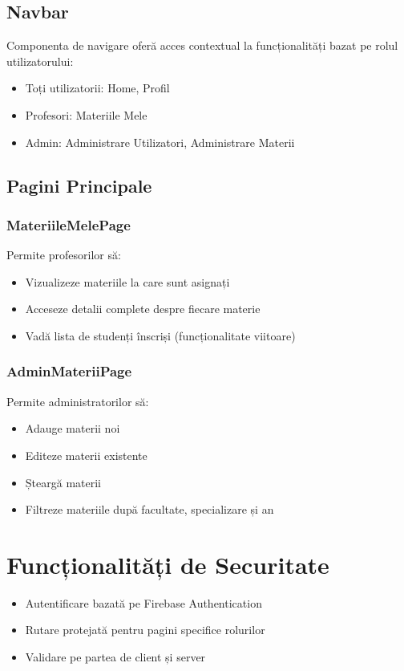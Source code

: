 \documentclass[12pt,a4paper]{article}
\begin{document}
\subsection{Navbar}
Componenta de navigare oferă acces contextual la funcționalități bazat pe rolul utilizatorului:
\begin{itemize}
    \item Toți utilizatorii: Home, Profil
    \item Profesori: Materiile Mele
    \item Admin: Administrare Utilizatori, Administrare Materii
\end{itemize}

\subsection{Pagini Principale}
\subsubsection{MateriileMelePage}
Permite profesorilor să:
\begin{itemize}
    \item Vizualizeze materiile la care sunt asignați
    \item Acceseze detalii complete despre fiecare materie
    \item Vadă lista de studenți înscriși (funcționalitate viitoare)
\end{itemize}

\subsubsection{AdminMateriiPage}
Permite administratorilor să:
\begin{itemize}
    \item Adauge materii noi
    \item Editeze materii existente
    \item Șteargă materii
    \item Filtreze materiile după facultate, specializare și an
\end{itemize}

\section{Funcționalități de Securitate}
\begin{itemize}
    \item Autentificare bazată pe Firebase Authentication
    \item Rutare protejată pentru pagini specifice rolurilor
    \item Validare pe partea de client și server
\end{itemize}
\end{document}
